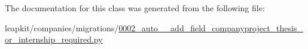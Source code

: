 The documentation for this class was generated from the following file\-:\begin{DoxyCompactItemize}
\item 
leapkit/companies/migrations/\hyperlink{0002__auto____add__field__companyproject__thesis__or__internship__required_8py}{0002\-\_\-auto\-\_\-\-\_\-add\-\_\-field\-\_\-companyproject\-\_\-thesis\-\_\-or\-\_\-internship\-\_\-required.\-py}\end{DoxyCompactItemize}
